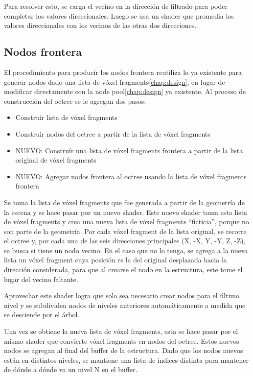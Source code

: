 Para resolver esto, se carga el vecino en la dirección de filtrado para poder completar los valores direccionales.
Luego se usa un shader que promedia los valores direccionales con los vecinos de las otras dos direcciones.

\subsection{Nodos frontera}\label{implementation:border_nodes}

El procedimiento para producir los nodos frontera reutiliza lo ya existente para generar nodos dado una lista de vóxel fragments\ref{chap:design}, en lugar de modificar directamente con la node pool\ref{chap:design} ya existente.
Al proceso de construcción del octree se le agregan dos pasos:

\begin{itemize}
    \item Construír lista de vóxel fragments
    \item Construir nodos del octree a partir de la lista de vóxel fragments
    \item NUEVO: Construír una lista de vóxel fragments frontera a partir de la lista original de vóxel fragments
    \item NUEVO: Agregar nodos frontera al octree usando la lista de vóxel fragments frontera
\end{itemize}

Se toma la lista de vóxel fragments que fue generada a partir de la geometría de la escena y se hace pasar por un nuevo shader.
Este nuevo shader toma esta lista de vóxel fragments y crea una nueva lista de vóxel fragments ``ficticia'', porque no son parte de la geometría.
Por cada vóxel fragment de la lista original, se recorre el octree y, por cada una de las seis direcciones principales (X, -X, Y, -Y, Z, -Z), se busca si tiene un nodo vecino.
En el caso que no lo tenga, se agrega a la nueva lista un vóxel fragment cuya posición es la del original desplazada hacia la dirección considerada, para que al crearse el nodo en la estructura, este tome el lugar del vecino faltante.

Aprovechar este shader logra que solo sea necesario crear nodos para el último nivel y se subdividen nodos de niveles anteriores automáticamente a medida que se desciende por el árbol.

Una vez se obtiene la nueva lista de vóxel fragments, esta se hace pasar por el mismo shader que convierte vóxel fragments en nodos del octree.
Estos nuevos nodos se agregan al final del buffer de la estructura.
Dado que los nodos nuevos están en distintos niveles, se mantiene una lista de índices distinta para mantener de dónde a dónde va un nivel N en el buffer.

